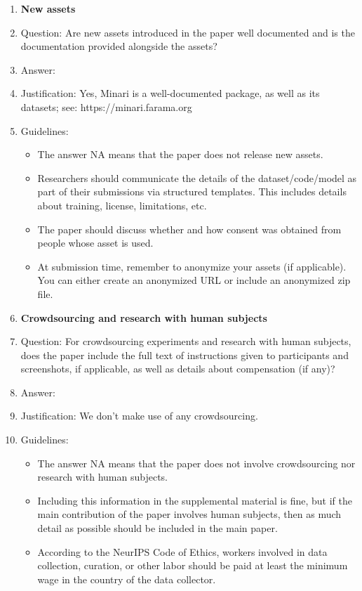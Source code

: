\documentclass{article}
\begin{document}
\begin{enumerate}
\item {\bf New assets}
    \item[] Question: Are new assets introduced in the paper well documented and is the documentation provided alongside the assets?
    \item[] Answer: \answerYes{} %
    \item[] Justification: Yes, Minari is a well-documented package, as well as its datasets; see: https://minari.farama.org
    \item[] Guidelines:
    \begin{itemize}
        \item The answer NA means that the paper does not release new assets.
        \item Researchers should communicate the details of the dataset/code/model as part of their submissions via structured templates. This includes details about training, license, limitations, etc. 
        \item The paper should discuss whether and how consent was obtained from people whose asset is used.
        \item At submission time, remember to anonymize your assets (if applicable). You can either create an anonymized URL or include an anonymized zip file.
    \end{itemize}

\item {\bf Crowdsourcing and research with human subjects}
    \item[] Question: For crowdsourcing experiments and research with human subjects, does the paper include the full text of instructions given to participants and screenshots, if applicable, as well as details about compensation (if any)? 
    \item[] Answer: \answerNA{} %
    \item[] Justification: We don't make use of any crowdsourcing.
    \item[] Guidelines:
    \begin{itemize}
        \item The answer NA means that the paper does not involve crowdsourcing nor research with human subjects.
        \item Including this information in the supplemental material is fine, but if the main contribution of the paper involves human subjects, then as much detail as possible should be included in the main paper. 
        \item According to the NeurIPS Code of Ethics, workers involved in data collection, curation, or other labor should be paid at least the minimum wage in the country of the data collector. 
    \end{itemize}


\end{enumerate}
\end{document}
